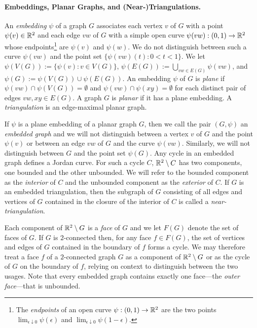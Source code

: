 \documentclass{patmorin}
\begin{document}
\paragraph*{Embeddings, Planar Graphs, and (Near-)Triangulations.}

An \emph{embedding} $\psi$ of a graph $G$ associates each vertex $v$ of $G$ with a point $\psi(v)\in \mathbb{R}^2$ and each edge $vw$ of $G$ with a simple open curve $\psi(vw):(0,1)\to\mathbb{R}^2$ whose endpoints\footnote{The \emph{endpoints} of an open curve $\psi:(0,1)\to\mathbb{R}^2$ are the two points $\lim_{\epsilon\downarrow 0} \psi(\epsilon)$ and $\lim_{\epsilon\downarrow 0}\psi(1-\epsilon)$.} are $\psi(v)$ and $\psi(w)$.  We do not distinguish between such a curve $\psi(vw)$ and the point set $\{\psi(vw)(t):0<t<1\}$.
We let $\psi(V(G)):=\{\psi(v):v\in V(G)\}$, $\psi(E(G)):=\bigcup_{vw\in E(G)} \psi(vw)$, and $\psi(G):=\psi(V(G))\cup\psi(E(G))$.  An embedding $\psi$ of $G$ is \emph{plane} if $\psi(vw)\cap\psi(V(G))=\emptyset$ and $\psi(vw)\cap\psi(xy)=\emptyset$ for each distinct pair of edges $vw,xy\in E(G)$.  A graph $G$ is \emph{planar} if it has a plane embedding. A \emph{triangulation} is an edge-maximal planar graph.

If $\psi$ is a plane embedding of a planar graph $G$, then we call the pair $(G,\psi)$ an \emph{embedded graph} and we will not distinguish between a vertex $v$ of $G$ and the point $\psi(v)$ or between an edge $vw$ of $G$ and the curve $\psi(vw)$.  Similarly, we will not distinguish between $G$ and the  point set $\psi(G)$.  Any cycle in an embedded graph defines a Jordan curve. For such a cycle $C$, $\mathbb{R}^2\setminus C$ has two components, one bounded and the other unbounded. We will refer to the bounded component as the \emph{interior} of $C$ and the unbounded component as the \emph{exterior} of $C$.  If $G$ is an embedded triangulation, then the subgraph of $G$ consisting of all edges and vertices of $G$ contained in the closure of the interior of $C$ is called a \emph{near-triangulation}.

Each component of $\mathbb{R}^2\setminus G$ is a \emph{face} of $G$ and we let $F(G)$ denote the set of faces of $G$.  If $G$ is $2$-connected then, for any face $f\in F(G)$, the set of vertices and edges of $G$ contained in the boundary of $f$ forms a cycle.  We may therefore treat a face $f$ of a $2$-connected graph $G$ as a component of $\mathbb{R}^2\setminus G$ or as the cycle of $G$ on the boundary of $f$, relying on context to distinguish between the two usages.  Note that every embedded graph contains exactly one face---the \emph{outer face}---that is unbounded.
\end{document}
